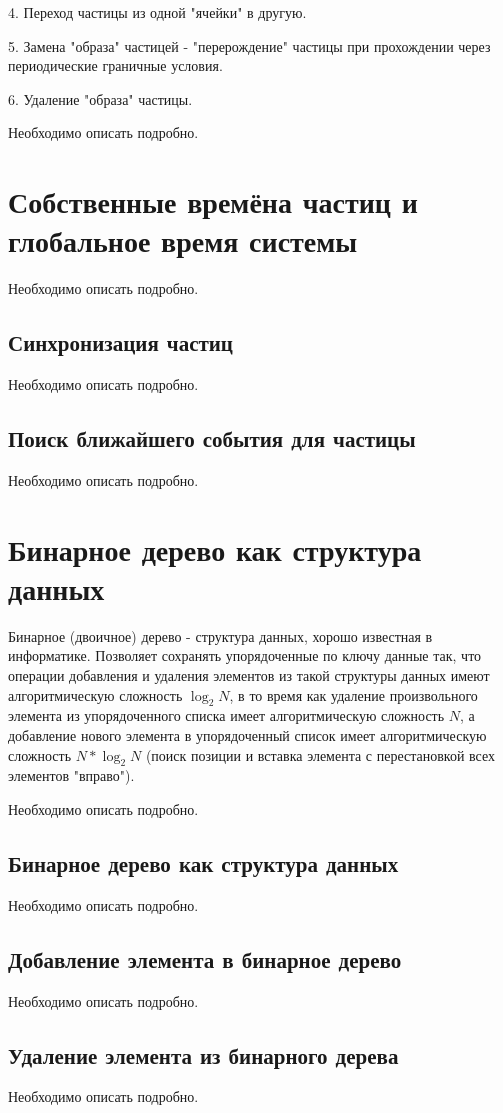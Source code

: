 \documentclass{article}
\begin{document}
4. Переход частицы из одной "ячейки" в другую.

5. Замена "образа" частицей - "перерождение" частицы при прохождении через периодические граничные условия.

6. Удаление "образа" частицы.

Необходимо описать подробно.

\newpage
\section{Собственные времёна частиц и глобальное время системы}
Необходимо описать подробно.
\subsection{Синхронизация частиц}
Необходимо описать подробно.
\subsection{Поиск ближайшего события для частицы}
Необходимо описать подробно.

\newpage
\section{Бинарное дерево как структура данных}
Бинарное (двоичное) дерево - структура данных, хорошо известная в информатике. Позволяет сохранять упорядоченные по ключу данные так, что операции добавления и удаления элементов из такой структуры данных  имеют алгоритмическую сложность $ \log_2{N} $, в то время как удаление произвольного элемента из упорядоченного списка имеет алгоритмическую сложность $ N $, а добавление нового элемента в упорядоченный список имеет алгоритмическую сложность $ N*\log_2{N} $ (поиск позиции и вставка элемента с перестановкой всех элементов "вправо").

Необходимо описать подробно.

\subsection{Бинарное дерево как структура данных}
Необходимо описать подробно.
\subsection{Добавление элемента в бинарное дерево}
Необходимо описать подробно.
\subsection{Удаление элемента из бинарного дерева}
Необходимо описать подробно.
\end{document}
